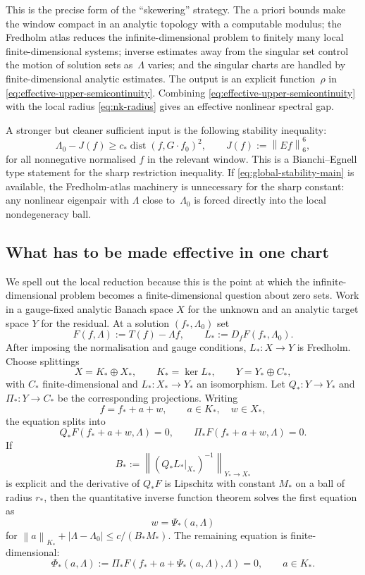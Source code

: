 \documentclass[12pt]{article}
\theoremstyle{definition}
\theoremstyle{remark}
\newcommand{\norm}[1]{\left\|#1\right\|}
\begin{document}
This is the precise form of the ``skewering'' strategy.  The a priori
bounds make the window compact in an analytic topology with a computable
modulus; the Fredholm atlas reduces the infinite-dimensional problem to
finitely many local finite-dimensional systems; inverse estimates away
from the singular set control the motion of solution sets as~$\Lambda$
varies; and the singular charts are handled by finite-dimensional analytic
estimates.  The output is an explicit function~$\rho$ in
\eqref{eq:effective-upper-semicontinuity}.  Combining
\eqref{eq:effective-upper-semicontinuity} with the local radius
\eqref{eq:nk-radius} gives an effective nonlinear spectral gap.

A stronger but cleaner sufficient input is the following stability
inequality:
\begin{equation}\label{eq:global-stability-main}
  \Lambda_0-J(f)
  \geq c_*\operatorname{dist}(f,G\cdot f_0)^2,
  \qquad
  J(f):=\norm{Ef}_6^6,
\end{equation}
for all nonnegative normalised $f$ in the relevant window.  This is a
Bianchi--Egnell type statement for the sharp restriction inequality.  If
\eqref{eq:global-stability-main} is available, the Fredholm-atlas
machinery is unnecessary for the sharp constant: any nonlinear eigenpair
with $\Lambda$ close to~$\Lambda_0$ is forced directly into the local
nondegeneracy ball.

\subsection{What has to be made effective in one chart}
\label{sec:effective-one-chart}

We spell out the local reduction because this is the point at which the
infinite-dimensional problem becomes a finite-dimensional question about
zero sets.  Work in a gauge-fixed analytic Banach space $X$ for the
unknown and an analytic target space $Y$ for the residual.  At a solution
$(f_*,\Lambda_0)$ set
\[
  F(f,\Lambda):=T(f)-\Lambda f,\qquad
  L_*:=D_fF(f_*,\Lambda_0).
\]
After imposing the normalisation and gauge conditions, $L_*:X\to Y$ is
Fredholm.  Choose splittings
\[
  X=K_*\oplus X_*,
  \qquad K_*=\ker L_*,
  \qquad
  Y=Y_*\oplus C_*,
\]
with $C_*$ finite-dimensional and $L_*:X_*\to Y_*$ an isomorphism.  Let
$Q_*:Y\to Y_*$ and $\Pi_*:Y\to C_*$ be the corresponding projections.
Writing
\[
  f=f_*+a+w,\qquad a\in K_*,\quad w\in X_*,
\]
the equation splits into
\[
  Q_*F(f_*+a+w,\Lambda)=0,
  \qquad
  \Pi_*F(f_*+a+w,\Lambda)=0.
\]
If
\[
  B_*:=\norm{(Q_*L_*|_{X_*})^{-1}}_{Y_*\to X_*}
\]
is explicit and the derivative of
$Q_*F$ is Lipschitz with constant $M_*$ on a ball of radius $r_*$, then
the quantitative inverse function theorem solves the first equation as
\[
  w=\Psi_*(a,\Lambda)
\]
for
$\norm{a}_{K_*}+|\Lambda-\Lambda_0|\leq c/(B_*M_*)$.  The remaining
equation is finite-dimensional:
\begin{equation}\label{eq:LS-reduced-map}
  \Phi_*(a,\Lambda)
  :=
  \Pi_*F(f_*+a+\Psi_*(a,\Lambda),\Lambda)=0,
  \qquad a\in K_*.
\end{equation}
\end{document}
